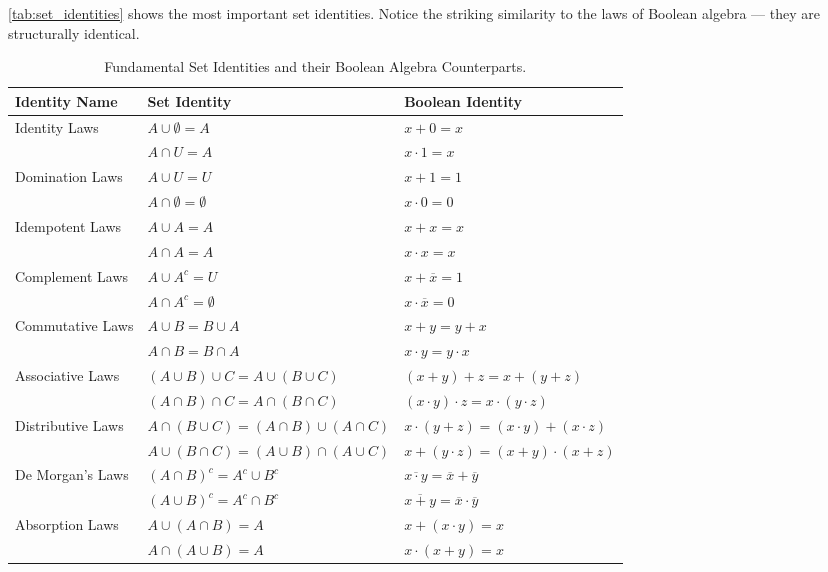 \autoref{tab:set_identities} shows the most important set identities. Notice the striking similarity to the laws of Boolean algebra — they are structurally identical.

\begin{table}
\centering
\caption{Fundamental Set Identities and their Boolean Algebra Counterparts.}
\label{tab:set_identities}
\renewcommand{\arraystretch}{1.4}
\begin{tabular}{|l|l|l|}
\hline
\textbf{Identity Name} & \textbf{Set Identity} & \textbf{Boolean Identity} \\
\hline
Identity Laws & $A \cup \emptyset = A$ & $x + 0 = x$ \\
& $A \cap U = A$ & $x \cdot 1 = x$ \\
\hline
Domination Laws & $A \cup U = U$ & $x + 1 = 1$ \\
& $A \cap \emptyset = \emptyset$ & $x \cdot 0 = 0$ \\
\hline
Idempotent Laws & $A \cup A = A$ & $x + x = x$ \\
& $A \cap A = A$ & $x \cdot x = x$ \\
\hline
Complement Laws & $A \cup A^c = U$ & $x + \overline{x} = 1$ \\
& $A \cap A^c = \emptyset$ & $x \cdot \overline{x} = 0$ \\
\hline
Commutative Laws & $A \cup B = B \cup A$ & $x + y = y + x$ \\
& $A \cap B = B \cap A$ & $x \cdot y = y \cdot x$ \\
\hline
Associative Laws & $(A \cup B) \cup C = A \cup (B \cup C)$ & $(x+y)+z = x+(y+z)$ \\
& $(A \cap B) \cap C = A \cap (B \cap C)$ & $(x \cdot y) \cdot z = x \cdot (y \cdot z)$ \\
\hline
Distributive Laws & $A \cap (B \cup C) = (A \cap B) \cup (A \cap C)$ & $x \cdot (y+z) = (x \cdot y)+(x \cdot z)$ \\
& $A \cup (B \cap C) = (A \cup B) \cap (A \cup C)$ & $x + (y \cdot z) = (x+y) \cdot (x+z)$ \\
\hline
De Morgan's Laws & $(A \cap B)^c = A^c \cup B^c$ & $\overline{x \cdot y} = \overline{x} + \overline{y}$ \\
& $(A \cup B)^c = A^c \cap B^c$ & $\overline{x + y} = \overline{x} \cdot \overline{y}$ \\
\hline
Absorption Laws & $A \cup (A \cap B) = A$ & $x + (x \cdot y) = x$ \\
& $A \cap (A \cup B) = A$ & $x \cdot (x+y) = x$ \\
\hline
\end{tabular}
\end{table}

